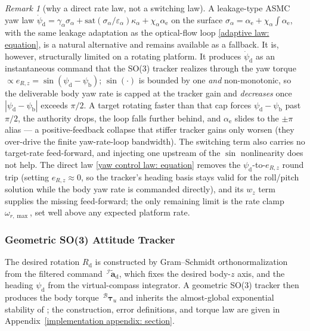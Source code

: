 \documentclass{IEEEtaes}
\theoremstyle{definition}
\theoremstyle{remark}
\newtheorem{remark}{Remark}
\begin{document}
\begin{remark}[why a direct rate law, not a switching law]\label{rem:yawceiling} A leakage-type ASMC yaw law $\dot{\psi}_\text{d}=\gamma_\alpha\sigma_\alpha+\text{sat}(\sigma_\alpha/\varepsilon_\alpha)\kappa_\alpha+\chi_\alpha\alpha_\text{e}$ on the surface $\sigma_\alpha=\alpha_\text{e}+\chi_\alpha\!\int\alpha_\text{e}$, with the same leakage adaptation as the optical-flow loop \eqref{adaptive law: equation}, is a natural alternative and remains available as a fallback. It is, however, structurally limited on a rotating platform. It produces $\dot{\psi}_\text{d}$ as an instantaneous command that the SO(3) tracker realizes through the yaw torque $\propto e_{R,z}=\sin(\psi_\text{d}-\psi_\text{b})$; $\sin(\cdot)$ is bounded by one \emph{and} non-monotonic, so the deliverable body yaw rate is capped at the tracker gain and \emph{decreases} once $|\psi_\text{d}-\psi_\text{b}|$ exceeds $\pi/2$. A target rotating faster than that cap forces $\psi_\text{d}-\psi_\text{b}$ past $\pi/2$, the authority drops, the loop falls further behind, and $\alpha_\text{e}$ slides to the $\pm\pi$ alias --- a positive-feedback collapse that stiffer tracker gains only worsen (they over-drive the finite yaw-rate-loop bandwidth). The switching term also carries no target-rate feed-forward, and injecting one upstream of the $\sin$ nonlinearity does not help. The direct law \eqref{yaw control law: equation} removes the $\psi_\text{d}$-to-$e_{R,z}$ round trip (setting $e_{R,z}\approx0$, so the tracker's heading basis stays valid for the roll/pitch solution while the body yaw rate is commanded directly), and its $w_z$ term supplies the missing feed-forward; the only remaining limit is the rate clamp $\omega_{r,\max}$, set well above any expected platform rate.\end{remark}

\subsubsection{Geometric SO(3) Attitude Tracker} \label{so3 inner loop: section}
The desired rotation $R_\text{d}$ is constructed by Gram--Schmidt orthonormalization from the filtered command $\,^\mathcal{I}\tilde{\boldsymbol{a}}_\text{d}$, which fixes the desired body-$z$ axis, and the heading $\psi_\text{d}$ from the virtual-compass integrator. A geometric SO(3) tracker then produces the body torque $\,^\mathcal{B}\boldsymbol{\tau}_u$ and inherits the almost-global exponential stability of \cite[Prop.~1]{lee2010}; the construction, error definitions, and torque law are given in Appendix~\ref{implementation appendix: section}.
\end{document}
